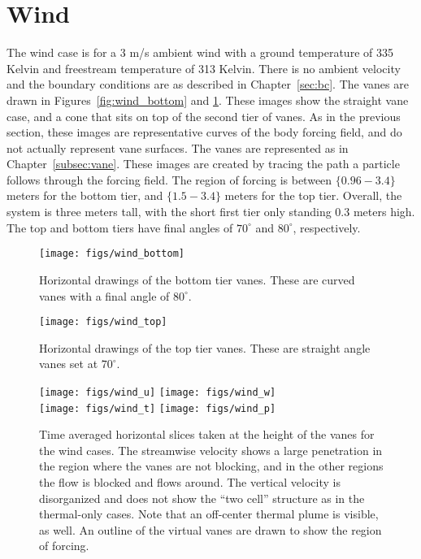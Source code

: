\section{Wind}

The wind case is for a 3 m/s ambient wind with a ground temperature of
335 Kelvin and freestream temperature of 313 Kelvin. There is no ambient
velocity and the boundary conditions are as described in
Chapter~\ref{sec:bc}. The vanes are drawn in
Figures~\ref{fig:wind_bottom} and \ref{fig:wind_top}. These images show
the straight vane case, and a cone that sits on top of the second tier of vanes. 
As in the previous section, these images are representative
curves of the body forcing field, and do not actually represent vane
surfaces. The vanes are represented as in Chapter~\ref{subsec:vane}. 
These images are created by tracing the path a particle follows through
the forcing field. The region of forcing is between $\{0.96-3.4\}$ meters
for the bottom tier, and $\{1.5-3.4\}$ meters for the top tier. Overall,
the system is three meters tall, with the short first tier only standing
0.3 meters high. The top and bottom tiers have final angles of
$70^{\circ}$ and $80^{\circ}$, respectively.

\begin{figure}[htb]
\centering
\begin{minipage}{0.45\textwidth}
\centering
 \texttt{[image: figs/wind\_bottom]}
 \caption{Horizontal drawings of the bottom tier vanes. These are curved 
 vanes with a final angle of $80^{\circ}$.}
 \label{fig:wind_bottom}  
\end{minipage}\hfill
\begin{minipage}{0.45\textwidth}
\centering
\texttt{[image: figs/wind\_top]}
\caption{Horizontal drawings of the top tier vanes. These are straight
 angle vanes set at $70^{\circ}$.} 
 \label{fig:wind_top}  
\end{minipage}
\end{figure}


%
%
\begin{figure}[htb]

  \centering
  \texttt{[image: figs/wind\_u]}
 \hfill
  \texttt{[image: figs/wind\_w]}
 \\
  \centering
  \texttt{[image: figs/wind\_t]}
 \hfill
  \texttt{[image: figs/wind\_p]}
 \caption{Time averaged horizontal slices taken at the height of the
 vanes for the wind cases. The streamwise velocity shows a large
 penetration in the region where the vanes are not blocking, and in the
 other regions the flow is blocked and flows around. The vertical
 velocity is disorganized and does not show the ``two cell'' structure
 as in the thermal-only cases.  Note that an off-center thermal plume is
 visible, as well. An outline of the virtual vanes are drawn to show the
 region of forcing.}  
 \label{fig:wind-hor}
\end{figure}


